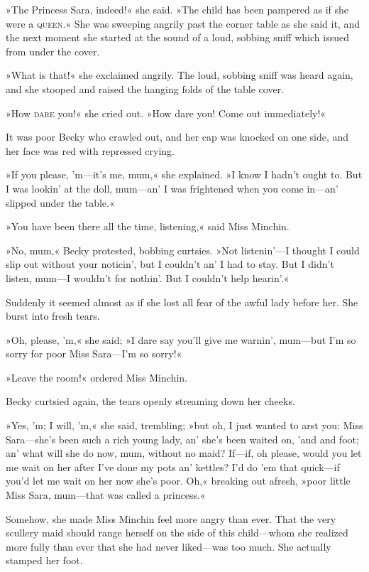 »The Princess Sara, indeed!« she said. »The child has been pampered as if she were a \textsc{queen}.« She was sweeping angrily past the corner table as she said it, and the next moment she started at the sound of a loud, sobbing sniff which issued from under the cover.

»What is that!« she exclaimed angrily. The loud, sobbing sniff was heard again, and she stooped and raised the hanging folds of the table cover.

»How \textsc{dare} you!« she cried out. »How dare you! Come out immediately!«

It was poor Becky who crawled out, and her cap was knocked on one side, and her face was red with repressed crying.

»If you please, 'm—it's me, mum,« she explained. »I know I hadn't ought to. But I was lookin' at the doll, mum—an' I was frightened when you come in—an' slipped under the table.«

»You have been there all the time, listening,« said Miss Minchin.

»No, mum,« Becky protested, bobbing curtsies. »Not listenin'—I thought I could slip out without your noticin', but I couldn't an' I had to stay. But I didn't listen, mum—I wouldn't for nothin'. But I couldn't help hearin'.«

Suddenly it seemed almost as if she lost all fear of the awful lady before her. She burst into fresh tears.

»Oh, please, 'm,« she said; »I dare say you'll give me warnin', mum—but I'm so sorry for poor Miss Sara—I'm so sorry!«

»Leave the room!« ordered Miss Minchin.

Becky curtsied again, the tears openly streaming down her cheeks.

»Yes, 'm; I will, 'm,« she said, trembling; »but oh, I just wanted to arst you: Miss Sara—she's been such a rich young lady, an' she's been waited on, 'and and foot; an' what will she do now, mum, without no maid? If—if, oh please, would you let me wait on her after I've done my pots an' kettles? I'd do 'em that quick—if you'd let me wait on her now she's poor. Oh,« breaking out afresh, »poor little Miss Sara, mum—that was called a princess.«

Somehow, she made Miss Minchin feel more angry than ever. That the very scullery maid should range herself on the side of this child—whom she realized more fully than ever that she had never liked—was too much. She actually stamped her foot.

